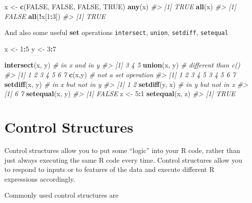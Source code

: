 \documentclass[]{book}
\newenvironment{Shaded}{\begin{snugshade}}{\end{snugshade}}
\newcommand{\KeywordTok}[1]{\textcolor[rgb]{0.13,0.29,0.53}{\textbf{#1}}}
\newcommand{\DecValTok}[1]{\textcolor[rgb]{0.00,0.00,0.81}{#1}}
\newcommand{\StringTok}[1]{\textcolor[rgb]{0.31,0.60,0.02}{#1}}
\newcommand{\CommentTok}[1]{\textcolor[rgb]{0.56,0.35,0.01}{\textit{#1}}}
\newcommand{\OtherTok}[1]{\textcolor[rgb]{0.56,0.35,0.01}{#1}}
\newcommand{\OperatorTok}[1]{\textcolor[rgb]{0.81,0.36,0.00}{\textbf{#1}}}
\newcommand{\NormalTok}[1]{#1}
\theoremstyle{definition}
\theoremstyle{definition}
\theoremstyle{definition}
\theoremstyle{remark}
\begin{document}
\begin{Shaded}
\begin{Highlighting}[]
\NormalTok{x <-}\StringTok{ }\KeywordTok{c}\NormalTok{(}\OtherTok{FALSE}\NormalTok{, }\OtherTok{FALSE}\NormalTok{, }\OtherTok{FALSE}\NormalTok{, }\OtherTok{TRUE}\NormalTok{)}
\KeywordTok{any}\NormalTok{(x)}
\CommentTok{#> [1] TRUE}
\KeywordTok{all}\NormalTok{(x)}
\CommentTok{#> [1] FALSE}
\KeywordTok{all}\NormalTok{(}\OperatorTok{!}\NormalTok{x[}\DecValTok{1}\OperatorTok{:}\DecValTok{3}\NormalTok{])}
\CommentTok{#> [1] TRUE}
\end{Highlighting}
\end{Shaded}

And also some useful \textbf{set} operations \texttt{intersect},
\texttt{union}, \texttt{setdiff}, \texttt{setequal}

\begin{Shaded}
\begin{Highlighting}[]
\NormalTok{x <-}\StringTok{ }\DecValTok{1}\OperatorTok{:}\DecValTok{5}
\NormalTok{y <-}\StringTok{ }\DecValTok{3}\OperatorTok{:}\DecValTok{7}

\KeywordTok{intersect}\NormalTok{(x, y) }\CommentTok{# in x and in y}
\CommentTok{#> [1] 3 4 5}
\KeywordTok{union}\NormalTok{(x, y)     }\CommentTok{# different than c()}
\CommentTok{#> [1] 1 2 3 4 5 6 7}
\KeywordTok{c}\NormalTok{(x,y)          }\CommentTok{# not a set operation}
\CommentTok{#>  [1] 1 2 3 4 5 3 4 5 6 7}
\KeywordTok{setdiff}\NormalTok{(x, y)   }\CommentTok{# in x but not in y}
\CommentTok{#> [1] 1 2}
\KeywordTok{setdiff}\NormalTok{(y, x)   }\CommentTok{# in y but not in x}
\CommentTok{#> [1] 6 7}
\KeywordTok{setequal}\NormalTok{(x, y)}
\CommentTok{#> [1] FALSE}
\NormalTok{z <-}\StringTok{ }\DecValTok{5}\OperatorTok{:}\DecValTok{1}
\KeywordTok{setequal}\NormalTok{(x, z)}
\CommentTok{#> [1] TRUE}
\end{Highlighting}
\end{Shaded}

\section{Control Structures}\label{control-structures}

Control structures allow you to put some ``logic'' into your R code,
rather than just always executing the same R code every time. Control
structures allow you to respond to inputs or to features of the data and
execute different R expressions accordingly.

Commonly used control structures are
\end{document}
